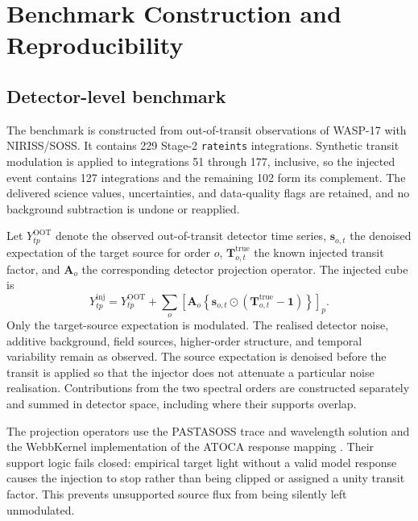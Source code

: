 \section{Benchmark Construction and Reproducibility}
\label{app:benchmarking}

\subsection{Detector-level benchmark}

The benchmark is constructed from out-of-transit observations of WASP-17 with
NIRISS/SOSS. It contains 229 Stage-2 \texttt{rateints} integrations. Synthetic
transit modulation is applied to integrations 51 through 177, inclusive, so
the injected event contains 127 integrations and the remaining 102 form its
complement. The delivered science values, uncertainties, and data-quality
flags are retained, and no background subtraction is undone or reapplied.

Let $Y^{\mathrm{OOT}}_{tp}$ denote the observed out-of-transit detector time
series, $\bm{s}_{o,t}$ the denoised expectation of the target source for order
$o$, $\bm{T}^{\mathrm{true}}_{o,t}$ the known injected transit factor, and
$\bm{A}_o$ the corresponding detector projection operator. The injected cube
is
\begin{equation}
 Y^{\mathrm{inj}}_{tp}=Y^{\mathrm{OOT}}_{tp}
 +\sum_o\left[\bm{A}_o\left\{\bm{s}_{o,t}\odot
 \left(\bm{T}^{\mathrm{true}}_{o,t}-\bm{1}\right)\right\}\right]_p .
 \label{eq:v45-injector}
\end{equation}
Only the target-source expectation is modulated. The realised detector noise,
additive background, field sources, higher-order structure, and temporal
variability remain as observed. The source expectation is denoised before the
transit is applied so that the injector does not attenuate a particular noise
realisation. Contributions from the two spectral orders are constructed
separately and summed in detector space, including where their supports
overlap.

The projection operators use the PASTASOSS trace and wavelength solution
\citep{BainesEtAl2023Trace,BainesEtAl2023Wavelength} and the WebbKernel
implementation of the ATOCA response mapping
\citep{DarveauBernierEtAl2022,JWSTPipeline2025}. Their support logic fails
closed: empirical target light without a valid model response causes the
injection to stop rather than being clipped or assigned a unity transit
factor. This prevents unsupported source flux from being silently left
unmodulated.

